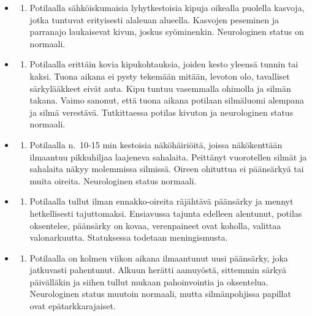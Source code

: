 \documentclass[
]{book}
\providecommand{\tightlist}{%
  \setlength{\itemsep}{0pt}\setlength{\parskip}{0pt}}
\begin{document}
\begin{itemize}
\tightlist
\item
  \begin{enumerate}
  \def\labelenumi{\alph{enumi}.}
  \tightlist
  \item
    Potilaalla sähköiskumaisia lyhytkestoisia kipuja oikealla puolella kasvoja, jotka tuntuvat erityisesti alaleuan alueella. Kasvojen peseminen ja parranajo laukaisevat kivun, joskus syöminenkin. Neurologinen status on normaali.
  \end{enumerate}
\item
  \begin{enumerate}
  \def\labelenumi{\alph{enumi}.}
  \setcounter{enumi}{1}
  \tightlist
  \item
    Potilaalla erittäin kovia kipukohtauksia, joiden kesto yleensä tunnin tai kaksi. Tuona aikana ei pysty tekemään mitään, levoton olo, tavalliset särkylääkkeet eivät auta. Kipu tuntuu vasemmalla ohimolla ja silmän takana. Vaimo sanonut, että tuona aikana potilaan silmäluomi alempana ja silmä verestävä. Tutkittaessa potilas kivuton ja neurologinen status normaali.
  \end{enumerate}
\item
  \begin{enumerate}
  \def\labelenumi{\alph{enumi}.}
  \setcounter{enumi}{2}
  \tightlist
  \item
    Potilaalla n.~10-15 min kestoisia näköhäiriöitä, joissa näkökenttään ilmaantuu pikkuhiljaa laajeneva sahalaita. Peittänyt vuorotellen silmät ja sahalaita näkyy molemmissa silmissä. Oireen ohituttua ei päänsärkyä tai muita oireita. Neurologinen status normaali.
  \end{enumerate}
\item
  \begin{enumerate}
  \def\labelenumi{\alph{enumi}.}
  \setcounter{enumi}{3}
  \tightlist
  \item
    Potilaalla tullut ilman ennakko-oireita räjähtävä päänsärky ja mennyt hetkellisesti tajuttomaksi. Ensiavussa tajunta edelleen alentunut, potilas oksentelee, päänsärky on kovaa, verenpaineet ovat koholla, valittaa valonarkuutta. Statuksessa todetaan meningismusta.
  \end{enumerate}
\item
  \begin{enumerate}
  \def\labelenumi{\alph{enumi}.}
  \setcounter{enumi}{4}
  \tightlist
  \item
    Potilaalla on kolmen viikon aikana ilmaantunut uusi päänsärky, joka jatkuvasti pahentunut. Alkuun herätti aamuyöstä, sittemmin särkyä päivälläkin ja siihen tullut mukaan pahoinvointia ja oksentelua. Neurologinen status muutoin normaali, mutta silmänpohjissa papillat ovat epätarkkarajaiset.

\end{enumerate}
\end{itemize}
\end{document}
